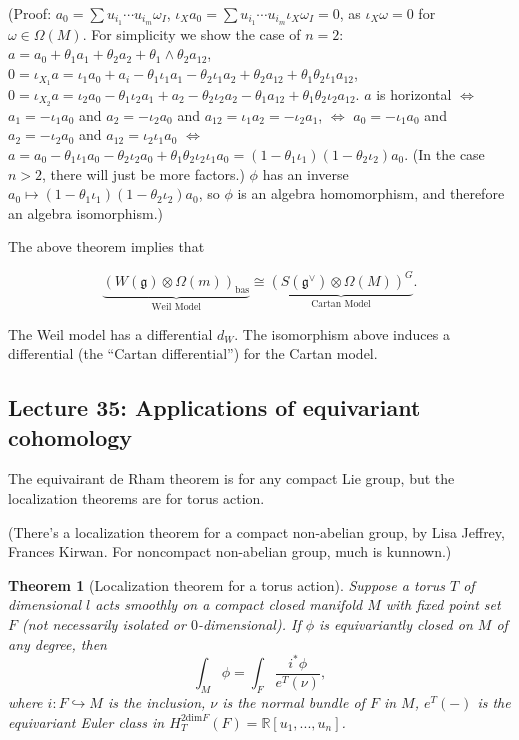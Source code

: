 \documentclass{article}
\theoremstyle{mystyle}
\newtheorem*{theorem*}{Theorem}
\theoremstyle{remark}
\numberwithin{equation}{section}
\begin{document}
(Proof: $a_0 = \sum u_{i_1}\cdots u_{i_m}\omega_I$, $\iota_X a_0 = \sum u_{i_1}\cdots u_{i_m} \iota_X \omega_I=0$, as $\iota_X\omega=0$ for $\omega \in \Omega(M)$. For simplicity we show the case of $n=2$: $a= a_0+\theta_1a_1+\theta_2a_2+\theta_1\wedge \theta_2 a_{12}$, $0=\iota_{X_1}a = \iota_1 a_0 + a_i-\theta_1\iota_1a_1 -\theta_2\iota_1a_2
+\theta_2a_{12}+\theta_1\theta_2\iota_1a_{12}$, $0=\iota_{X_2}a = \iota_2a_0 -\theta_1\iota_2a_1 +a_2 - \theta_2\iota_2a_2 - \theta_1 a_{12}
+\theta_1\theta_2\iota_2a_{12}$. $a$ is horizontal $\Leftrightarrow$ $a_1 = -\iota_1a_0$ and $a_2 = -\iota_2 a_0$ and $a_{12} = \iota_1 a_2 = - \iota_2a_1$, $\Leftrightarrow$ $a_0=-\iota_1a_0$ and $a_2 = -\iota_2 a_0$ and $a_{12} = \iota_2\iota_1 a_0$ $\Leftrightarrow$ $a = a_0 - \theta_1\iota_1a_0-\theta_2\iota_2a_0 + \theta_1\theta_2\iota_2\iota_1a_0 
=(1-\theta_1\iota_1)(1-\theta_2\iota_2)a_0$. (In the case $n>2$, there will just be more factors.) $\phi$ has an inverse $a_0\mapsto (1-\theta_1\iota_1)(1-\theta_2\iota_2)a_0$, so $\phi$ is an algebra homomorphism, and therefore an algebra isomorphism.)


The above theorem implies that

$$\underbrace{\left(W(\mathfrak{g})\otimes \Omega(m)\right)_{\text{bas}}}_{\text{Weil Model}} \cong 
\underbrace{\left(S(\mathfrak{g}^\vee) \otimes \Omega(M)\right)^G}_{\text{Cartan Model}}.$$


The Weil model has a differential $d_W$. The isomorphism above induces a differential (the ``Cartan differential'') for the Cartan model.
 
 
 
 

 
 
\subsection{Lecture 35: Applications of equivariant cohomology}




The equivairant de Rham theorem is for any compact Lie group, but the localization theorems are for torus action.


(There's a localization theorem for a compact non-abelian group, by Lisa Jeffrey, Frances Kirwan. For noncompact non-abelian group, much is kunnown.)


\begin{theorem*}[Localization theorem for a torus action]
Suppose a torus $T$ of dimensional $l$ acts smoothly on a compact closed manifold $M$ with fixed point set $F$ (not necessarily isolated or $0$-dimensional). If $\phi$ is equivariantly closed on $M$ of any degree, then 
$$\int_M\phi = \int_F  \frac{i^*\phi}{e^T(\nu)},$$
where $i\colon F\hookrightarrow M$ is the inclusion, $\nu$ is the normal bundle of $F$ in $M$, $e^T(-)$ is the equivariant Euler class in $H^{2\text{dim}F}_T(F) = \mathbb{R}[u_1,...,u_n]$. 
\end{theorem*}
\end{document}
